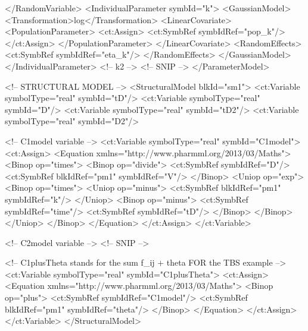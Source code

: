 \documentclass[a4paper,10pt]{article}
\begin{document}
\begin{xmlcode}
            </RandomVariable>
            <IndividualParameter symbId="k">
                <GaussianModel>
                    <Transformation>log</Transformation>
                    <LinearCovariate>
                        <PopulationParameter>
                            <ct:Assign>
                                <ct:SymbRef symbIdRef="pop_k"/>
                            </ct:Assign>
                        </PopulationParameter>
                    </LinearCovariate>
                    <RandomEffects>
                        <ct:SymbRef symbIdRef="eta_k"/>
                    </RandomEffects>
                </GaussianModel>
            </IndividualParameter>
            <!-- k2 -->
	    <!-- SNIP -->
        </ParameterModel>
        
        <!-- STRUCTURAL MODEL -->
        <StructuralModel blkId="sm1">
            <ct:Variable symbolType="real" symbId="tD"/>
            <ct:Variable symbolType="real" symbId="D"/>
            <ct:Variable symbolType="real" symbId="tD2"/>
            <ct:Variable symbolType="real" symbId="D2"/>
            
            <!-- C1model variable -->
            <ct:Variable symbolType="real" symbId="C1model">
                <ct:Assign>
                    <Equation xmlns="http://www.pharmml.org/2013/03/Maths">
                        <Binop op="times">
                            <Binop op="divide">
                                <ct:SymbRef symbIdRef="D"/>
                                <ct:SymbRef blkIdRef="pm1" symbIdRef="V"/>
                            </Binop>
                            <Uniop op="exp">
                                <Binop op="times">
                                    <Uniop op="minus">
                                        <ct:SymbRef blkIdRef="pm1" symbIdRef="k"/>
                                    </Uniop>
                                    <Binop op="minus">
                                        <ct:SymbRef symbIdRef="time"/>
                                        <ct:SymbRef symbIdRef="tD"/>
                                    </Binop>
                                </Binop>
                            </Uniop>
                        </Binop>
                    </Equation>
                </ct:Assign>
            </ct:Variable>
            
            <!-- C2model variable -->
	    <!-- SNIP -->
	    
            <!-- C1plusTheta stands for the sum f_ij + theta FOR the TBS example -->
            <ct:Variable symbolType="real" symbId="C1plusTheta">
                <ct:Assign>
                    <Equation xmlns="http://www.pharmml.org/2013/03/Maths">
                        <Binop op="plus">
                            <ct:SymbRef symbIdRef="C1model"/>
                            <ct:SymbRef blkIdRef="pm1" symbIdRef="theta"/>
                        </Binop>
                    </Equation>
                </ct:Assign>
            </ct:Variable>
        </StructuralModel>
        

\end{xmlcode}
\end{document}
